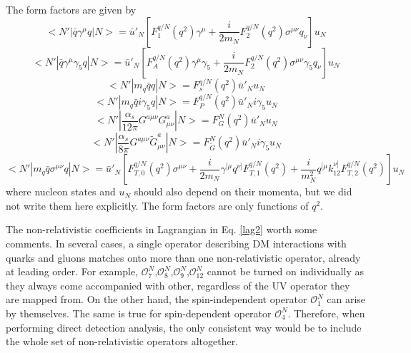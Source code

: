 \documentclass[12pt]{article}
\begin{document}
The form factors are given by 
$$
<N'|\bar q \gamma^\mu q|N> = \bar u'_N [ F_1^{q/N}(q^2) \gamma^\mu + \frac{i}{2m_N} F_2^{q/N}(q^2) \sigma^{\mu\nu} q_\nu] u_N
$$
$$
<N'|\bar q \gamma^\mu \gamma_5 q|N> = \bar u'_N [ F_A^{q/N}(q^2) \gamma^\mu \gamma_5 + \frac{i}{2m_N} F_2^{q/N}(q^2) \sigma^{\mu\nu} \gamma_5 q_\nu] u_N
$$
$$
<N'| m_q \bar q q|N> = F_s^{q/N}(q^2)\bar u'_N  u_N
$$
$$
<N'| m_q \bar q i \gamma_5 q|N> = F_P^{q/N}(q^2)\bar u'_N i \gamma_5 u_N
$$
$$
<N'| \frac{\alpha_s }{12 \pi } G^{a\mu \nu } G_{\mu\nu }^{a} |N> = F_G^{N}(q^2)\bar u'_N  u_N
$$
$$
<N'| \frac{\alpha_s }{8 \pi } G^{a\mu \nu } \tilde G_{\mu\nu }^{a} |N> = F_{\tilde G} ^{N}(q^2)\bar u'_N  i \gamma_5 u_N
$$
$$
<N'|m_q \bar q \sigma^{\mu\nu} q|N> = \bar u'_N [F_{T,0}^{q/N}(q^2) \sigma^{\mu \nu } + \frac{i}{2m_N} \gamma^{ [\mu} q^{ \nu ] } F_{T,1}^{q/N} (q^2) +
\frac{i}{m_N^2} q^{ [ \mu}k_{12}^{\nu ]} F_{T,2}^{q/N} (q^2) ] u_N
$$
where nucleon states and $u_N$ should also depend on their momenta, but we did not write them here explicitly. The form factors are only functions of $q^2$. 

The non-relativistic coefficients in Lagrangian in Eq. \ref{lag2} worth some comments. In several cases, a single operator describing DM interactions with quarks and gluons matches onto more than one non-relativistic operator, already at leading order. For example, $\mathcal O_7^N$,$\mathcal O_8^N$,$\mathcal O_9^N$,$\mathcal O_{12}^N$ cannot be turned on individually as they always come accompanied with other, regardless of the UV operator they are mapped from. On the other hand, the spin-independent operator $\mathcal O_1^N$ can arise by themselves. The same is true for spin-dependent operator $\mathcal O_4^N$. Therefore, when performing direct detection analysis, the only consistent way would be to include the whole set of non-relativistic operators altogether. 
\end{document}
